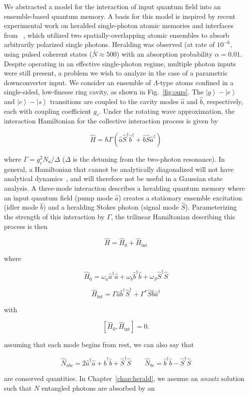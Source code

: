 \documentclass[aps,twocolumn,secnumarabic,amsmath,amssymb,pra,groupedaddress,
showpacs, showkeys]{revtex4-1}
\newcommand{\ket}[1]{\left|#1\right\rangle}
\newcommand{\pna}[1]{\left(#1\right)}
\newcommand{\pnb}[1]{\left[#1\right]}
\newcommand{\eqn}[1]{
\begin{equation}
	#1
\end{equation}
}
\begin{document}
We abstracted a model for the interaction of input quantum field into an
ensemble-based quantum memory. A basis for this model is inspired by recent
experimental work on heralded single-photon atomic memories and interfaces from
\cite{PhysRevLett.98.183601}~\cite{PhysRevLett.103.043601}, which utilized two
spatially-overlapping atomic ensembles to absorb arbitrarily polarized single
photons.  Heralding was observed (at rate of $10^{-6}$, using pulsed coherent
states ($\bar{N}\approx 500$) with an absorption probability
$\alpha=0.01$. Despite operating in an effective single-photon regime, multiple
photon inputs were still present, a problem we wish to analyze in the case of a
parametric downconverter input.  We consider an ensemble of $\Lambda$-type
atoms confined in a single-sided, low-finesse ring cavity, as shown in
Fig.~\ref{fig:ours}. The $\ket{g}-\ket{e}$ and $\ket{e}-\ket{s}$ transitions
are coupled to the cavity modes $\hat{a}$ and $\hat{b}$, respectively, each
with coupling coefficient $g_c$. Under the rotating wave approximation, the
interaction Hamiltonian for the collective interaction process is given by  
\eqn{
\hat{H} = \hbar\Gamma \pna{\hat{a}\hat{S}^{\dagger}\hat{b}^{\dagger} + \hat{b}\hat{S}\hat{a}^{\dagger}}\label{eq:trilinear}
}
where $\Gamma=g_c^2 N_a/\Delta$ ($\Delta$ is the detuning from the two-photon
resonance). In general, a Hamiltonian that cannot be analytically diagonalized
will not have analytical dynamics~\cite{theoretical_qoptics,group_qoptics}, and
will therefore not be useful in a Gaussian state analysis. A three-mode
interaction describes a heralding quantum memory where an input quantum field
(pump mode $\hat{a}$) creates a stationary ensemble excitation (idler mode
$\hat{b}$) and a heralding Stokes photon (signal mode
$\hat{S}$). Parameterizing the strength of this interaction by $\Gamma$, the
trilinear Hamiltonian describing this process is then
\eqn{
\hat{H}=\hat{H}_0+\hat{H}_{\textrm{int}}\label{eq:tri_h_total}
}
where
\eqn{
\hat{H}_0=\omega_a \hat{a}^{\dagger}\hat{a}+\omega_b \hat{b}^{\dagger}\hat{b}+\omega_S \hat{S}^{\dagger}\hat{S}
}
\eqn{
\hat{H}_{\textrm{int}}=\Gamma \hat{a}\hat{b}^{\dagger}\hat{S}^{\dagger}+\Gamma^* \hat{S}\hat{b}\hat{a}^{\dagger}
}
with 
\eqn{
\pnb{\hat{H}_0, \hat{H}_{\textrm{int}}}=0. 
}
assuming that each mode begins from rest, we can also say that 
\eqn{
\hat{N}_{abc}= 2\hat{a}^{\dagger}\hat{a}+\hat{b}^{\dagger}\hat{b} +\hat{S}^{\dagger}\hat{S} \qquad \hat{N}_{bc}=\hat{b}^{\dagger}\hat{b}-\hat{S}^{\dagger}\hat{S}
}
are conserved quantities. In Chapter~\ref{chap:herald}, we assume an
\emph{anzatz} solution such that $N$ entangled photons are absorbed by an
\end{document}

